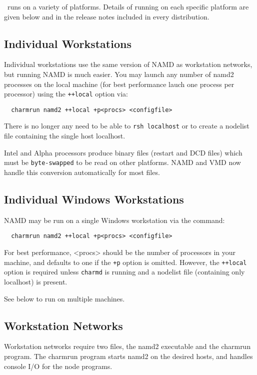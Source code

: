 \NAMD\ runs on a variety of platforms.  Details of running on each
specific platform are given below and in the release notes included
in every distribution.

\subsection{Individual Workstations}

Individual workstations use the same version of NAMD as workstation
networks, but running NAMD is much easier.  You may launch any number
of namd2 processes on the local machine (for best performance lauch
one process per processor) using the \verb#++local# option via:

\begin{verbatim}
  charmrun namd2 ++local +p<procs> <configfile>
\end{verbatim}

There is no longer any need to be able to \verb#rsh localhost# or to
create a nodelist file containing the single host localhost.

Intel and Alpha processors produce binary files (restart and DCD
files) which must be \verb#byte-swapped# to be read on other platforms.
NAMD and VMD now handle this conversion automatically for most files.

\subsection{Individual Windows Workstations}

NAMD may be run on a single Windows workstation via the command:

\begin{verbatim}
  charmrun namd2 ++local +p<procs> <configfile>
\end{verbatim}

For best performance, <procs> should be the number of processors in
your machine, and defaults to one if the \verb#+p# option is omitted.
However, the \verb#++local# option is required unless \verb#charmd# is running
and a nodelist file (containing only localhost) is present.

See below to run on multiple machines.

\subsection{Workstation Networks}

Workstation networks require two files, the namd2 executable and the
charmrun program.  The charmrun program starts namd2 on the desired
hosts, and handles console I/O for the node programs.

